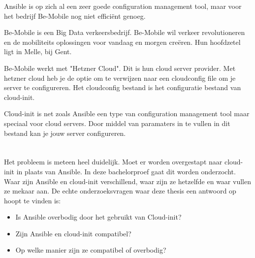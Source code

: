 Ansible is op zich al een zeer goede configuration management tool, maar voor het bedrijf Be-Mobile nog niet efficiënt genoeg. 

Be-Mobile is een Big Data verkeersbedrijf. Be-Mobile wil verkeer revolutioneren en de mobiliteits oplossingen voor vandaag en morgen creëren. Hun hoofdzetel ligt in Melle, bij Gent. 

Be-Mobile werkt met "Hetzner Cloud". Dit is hun cloud server provider. Met hetzner cloud heb je de optie om te verwijzen naar een cloudconfig file om je server te configureren. Het cloudconfig bestand is het configuratie  bestand van cloud-init. 

Cloud-init is net zoals Ansible een type van configuration management tool maar speciaal voor cloud servers. Door middel van paramaters in te vullen in dit bestand kan je jouw server configureren.
 


\section{}
\label{sec:probleemstellingonderzoeksvraag}

Het probleem is meteen heel duidelijk. Moet er worden overgestapt naar cloud-init in plaats van Ansible. In deze bachelorproef gaat dit worden onderzocht. Waar zijn Ansible en cloud-init verschillend, waar zijn ze hetzelfde en waar vullen ze mekaar aan. De echte onderzoeksvragen waar deze thesis een antwoord op hoopt te vinden is:

\begin{itemize}
    \item Is Ansible overbodig door het gebruikt van Cloud-init?
    \item Zijn Ansible en cloud-init compatibel?
    \item Op welke manier zijn ze compatibel of overbodig?
\end{itemize}



